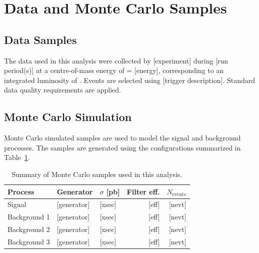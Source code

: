 
\section{Data and Monte Carlo Samples}
\label{sec:data_mc}


\subsection{Data Samples}
\label{sec:data_mc:data}


The data used in this analysis were collected by [experiment] during
[run period(s)] at a centre-of-mass energy of \sqrts = [energy],
corresponding to an integrated luminosity of \lumival.
Events are selected using [trigger description].
Standard data quality requirements are applied.

\subsection{Monte Carlo Simulation}
\label{sec:data_mc:mc}


Monte Carlo simulated samples are used to model the signal and background
processes. The samples are generated using the configurations summarized in
Table~\ref{tab:mc_samples}.


\begin{table}[htbp]
  \centering
  \caption{Summary of Monte Carlo samples used in this analysis.}
  \label{tab:mc_samples}
  \begin{tabular}{lllrr}
    \toprule
    Process & Generator & $\sigma$ [pb] & Filter eff. & $N_\text{events}$ \\
    \midrule
    Signal          & [generator] & [xsec] & [eff] & [nevt] \\
    \midrule
    Background 1    & [generator] & [xsec] & [eff] & [nevt] \\
    Background 2    & [generator] & [xsec] & [eff] & [nevt] \\
    Background 3    & [generator] & [xsec] & [eff] & [nevt] \\
    \bottomrule
  \end{tabular}
\end{table}

